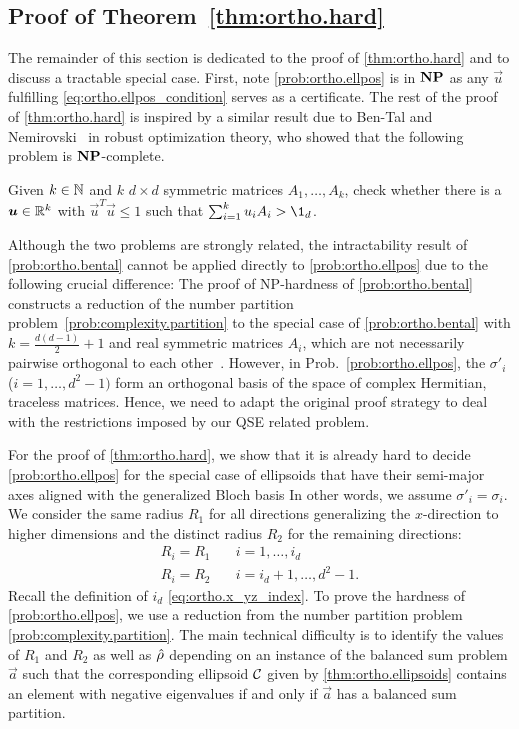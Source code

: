 \subsection{Proof of Theorem~\ref{thm:ortho.hard}}
\label{sub:error.ellpos}

The remainder of this section is dedicated to the proof of \cref{thm:ortho.hard} and to discuss a tractable special case.
First, note \cref{prob:ortho.ellpos} is in $\mathbf{NP}$ as any $\vec u$ fulfilling \cref{eq:ortho.ellpos_condition} serves as a certificate.
The rest of the proof of \cref{thm:ortho.hard} is inspired by a similar result due to Ben-Tal and Nemirovski~\cite{Tal_1998_Robust} in robust optimization theory, who showed that the following problem is $\mathbf{NP}$-complete.
\begin{problem}
  \label{prob:ortho.bental}
  Given $k \in {\mathbb{N}}$ and $k$ $d\times d$ symmetric matrices $A_{1},\ldots,A_{k}$, check whether there is a ${\boldsymbol{u}} \in {\mathbb{R}}^k$ with $\vec{u}^{T}\vec{u} \leq 1$ such that $\sum_{i=1}^{k}u_{i}A_{i} > \1_{d}$.
\end{problem}
Although the two problems are strongly related, the intractability result of \cref{prob:ortho.bental} cannot be applied directly to \cref{prob:ortho.ellpos} due to the following crucial difference:
The proof of NP-hardness of \cref{prob:ortho.bental} constructs a reduction of the number partition problem~\ref{prob:complexity.partition} to the special case of \cref{prob:ortho.bental} with $k=\frac{d(d-1)}{2} + 1$ and real symmetric matrices $A_i$, which are not necessarily pairwise orthogonal to each other~\cite[Sec.~3.4.1]{Tal_1998_Robust}.
However, in Prob.~\ref{prob:ortho.ellpos}, the $\sigma'_i$ ($i=1,\ldots,d^2 - 1)$ form an orthogonal basis of the space of complex Hermitian, traceless matrices.
Hence, we need to adapt the original proof strategy to deal with the restrictions imposed by our QSE related problem.

For the proof of \cref{thm:ortho.hard}, we show that it is already hard to decide \cref{prob:ortho.ellpos} for the special case of ellipsoids that have their semi-major axes aligned with the generalized Bloch basis
In other words, we assume $\sigma'_i = \sigma_i$.
We consider the same radius $R_{1}$ for all directions generalizing the $x$-direction to higher dimensions and the distinct radius $R_{2}$ for the remaining directions:
\[
  \label{eq:ortho.subclass}
  \begin{split}
    R_{i}=R_{1} &\quad i=1,\ldots,i_{d}\\
    R_{i}=R_{2} &\quad i=i_{d}+1,\ldots,d^{2}-1.
  \end{split}
\]
Recall the definition of $i_d$ \cref{eq:ortho.x_yz_index}.
To prove the hardness of \cref{prob:ortho.ellpos}, we use a reduction from the number partition problem \ref{prob:complexity.partition}.
The main technical difficulty is to identify the values of $R_1$ and $R_2$ as well as $\hat{\rho}$ depending on an instance of the balanced sum problem $\vec a$ such that the corresponding ellipsoid $\mathcal{C}$ given by \cref{thm:ortho.ellipsoids} contains an element with negative eigenvalues if and only if $\vec a$ has a balanced sum partition.\\




